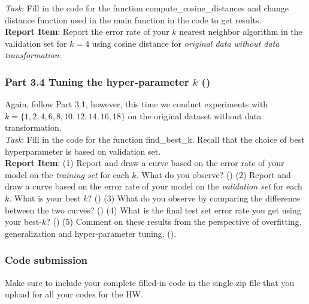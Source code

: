 \noindent \emph{Task}: Fill in the code for the function \colorbox{Gainsboro!60!Lavender}{compute\_cosine\_distances} and change distance function used in the main function in the code to get results.\\

\noindent \textbf{Report Item}:  Report the error rate of your $k$ nearest neighbor algorithm in the validation set for $k=4$ using cosine distance for \emph{original data without data transformation}.


\subsubsection*{Part 3.4 Tuning the hyper-parameter $k$ ()}
Again, follow Part 3.1, however, this time we conduct experiments with $k=\{1, 2, 4, 6, 8, 10, 12, 14, 16, 18\}$ on the original dataset without data transformation.\\

\noindent \emph{Task}: Fill in the code for the function \colorbox{Gainsboro!60!Lavender}{find\_best\_k}. Recall that the choice of best hyperparameter is based on validation set.\\

\noindent \textbf{Report Item}: (1) Report and draw a curve based on the error rate of your model on the \emph {training set} for each $k$. What do you observe? () (2) Report and draw a curve based on the error rate of your model on the \emph {validation set} for each $k$. What is your best $k$? () (3) What do you observe by comparing the difference between the two curves? () (4) What is the final test set error rate you get using your best-$k$? (\blue{1pt}) (5) Comment on these results from the perspective of overfitting, generalization and hyper-parameter tuning. ().

\subsubsection*{Code submission}

Make sure to include your complete filled-in code in the single zip file that you upload for all your codes for the HW.